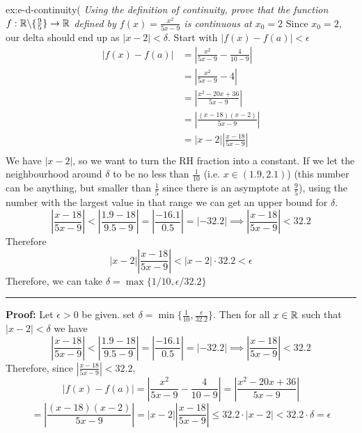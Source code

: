 \documentclass[landscape, 8pt]{extarticle}
\begin{document}
\begin{multicols}{3}
\begin{xmp}{ex:e-d-continuity}{(}
\textit{Using the definition of continuity, prove that the function $f: \mathbb{R}\backslash \{\frac{9}{5}\}\to \mathbb{R}$ defined by $f(x)=\frac{x^{2}}{5x-9}$ is continuous at $x_{0}= 2$}
Since $x_{0} = 2$, our delta should end up as $\lvert x-2\rvert < \delta$. Start with $\lvert f(x) - f(a)\rvert  < \epsilon$
\[\begin{aligned}
    \lvert f(x)-f(a) \rvert  & = \left\lvert  \frac{x^{2}}{5x-9}-\frac{4}{10-9}  \right\rvert \\
    &=\left\lvert  \frac{x^{2}}{5x-9}-4  \right\rvert \\
    &=\left\lvert  \frac{x^{2}-20x+36}{5x-9}  \right\rvert \\
    &=\left\lvert \frac{(x-18)(x-2)}{5x-9}  \right\rvert  \\
    &= \lvert x-2 \rvert \left\lvert  \frac{x-18}{5x-9}  \right\rvert \\
\end{aligned}\]
We have $\lvert x-2\rvert$, so we want to turn the RH fraction into a constant. If we let the neighbourhood around $\delta$ to be no less than $\frac{1}{10}$ (i.e. $x\in(1.9, 2.1)$) (this number can be anything, but smaller than $\frac{1}{5}$ since there is an asymptote at $\frac{9}{5}$), using the number with the largest value in that range we can get an upper bound for $\delta$.
\[\left\lvert \frac{x-18}{5x-9}\right\rvert < \left\lvert \frac{1.9 - 18}{9.5 - 9}\right\rvert = \left\lvert \frac{-16.1}{0.5} \right\rvert = \left\lvert -32.2 \right\rvert \implies \left\lvert \frac{x-18}{5x-9}\right\rvert < 32.2\]
Therefore
\[\lvert x-2 \rvert \left\lvert  \frac{x-18}{5x-9}  \right\rvert < \lvert x-2 \rvert \cdot 32.2 < \epsilon\]
Therefore, we can take $\delta = \max \{1/10, \epsilon / 32.2\}$
\vspace{3pt}
\hrule
\vspace{3pt}
\noindent\textbf{Proof:} Let $\epsilon > 0$ be given. set $\delta = \min\{\frac{1}{10}, \frac{\epsilon}{32.2}\}$. Then for all $x\in \mathbb{R}$ such that $\lvert x - 2\rvert < \delta$ we have
\[\left\lvert \frac{x-18}{5x-9}\right\rvert < \left\lvert \frac{1.9 - 18}{9.5 - 9}\right\rvert = \left\lvert \frac{-16.1}{0.5} \right\rvert = \left\lvert -32.2 \right\rvert \implies \left\lvert \frac{x-18}{5x-9}\right\rvert < 32.2\]
Therefore, since $\left\lvert \frac{x-18}{5x-9}\right\rvert < 32.2$,
\[
    \lvert f(x) - f(a)\rvert = \left\lvert  \frac{x^{2}}{5x-9}-\frac{4}{10-9}  \right\rvert = \left\lvert  \frac{x^{2}-20x+36}{5x-9}  \right\rvert
\]\[
    = \left\lvert \frac{(x-18)(x-2)}{5x-9}  \right\rvert = \lvert x-2 \rvert \left\lvert  \frac{x-18}{5x-9}  \right\rvert \le 32.2 \cdot \lvert x - 2\rvert < 32.2 \cdot \delta = \epsilon
\]
\end{xmp}
\vspace{-5pt}


\end{multicols}
\end{document}
